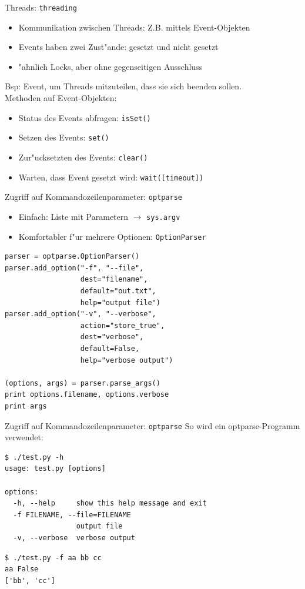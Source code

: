\begin{frame}{Threads: \texttt{threading}}
\begin{itemize}
\item Kommunikation zwischen Threads: Z.B. mittels \alert{Event-Objekten}
\item Events haben zwei Zust"ande: gesetzt und nicht gesetzt
\item "ahnlich Locks, aber ohne gegenseitigen Ausschluss
\end{itemize}
Bsp: Event, um Threads mitzuteilen, dass sie sich beenden sollen.\\
Methoden auf Event-Objekten:
\begin{itemize}
\item Status des Events abfragen: \texttt{isSet()}
\item Setzen des Events: \texttt{set()}
\item Zur"ucksetzten des Events: \texttt{clear()}
\item Warten, dass Event gesetzt wird: \texttt{wait([timeout])}
\end{itemize}
\end{frame}

\begin{frame}[fragile]{Zugriff auf Kommandozeilenparameter: \texttt{optparse}}
\begin{itemize}
\item Einfach: Liste mit Parametern $\rightarrow$ \texttt{sys.argv}
\item Komfortabler f"ur mehrere Optionen: \texttt{OptionParser}
\end{itemize}
\begin{lstlisting}[style=Python]
parser = optparse.OptionParser()
parser.add_option("-f", "--file", 
                  dest="filename",
                  default="out.txt",
                  help="output file")
parser.add_option("-v", "--verbose",
                  action="store_true", 
                  dest="verbose", 
                  default=False,
                  help="verbose output")

(options, args) = parser.parse_args()
print options.filename, options.verbose
print args
\end{lstlisting}
\end{frame}
\begin{frame}[fragile]{Zugriff auf Kommandozeilenparameter: \texttt{optparse}}
So wird ein optparse-Programm verwendet:
\begin{lstlisting}[style=Shell]
$ ./test.py -h
usage: test.py [options]

options:
  -h, --help     show this help message and exit
  -f FILENAME, --file=FILENAME
                 output file
  -v, --verbose  verbose output
\end{lstlisting} %
\begin{lstlisting}[style=Shell]
$ ./test.py -f aa bb cc
aa False
['bb', 'cc']
\end{lstlisting} %
\end{frame}

